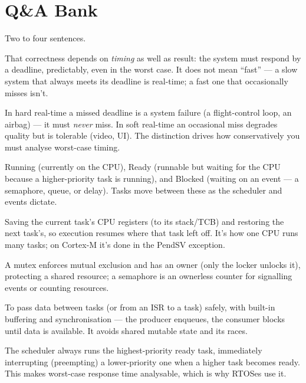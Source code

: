 \section{Q\&A Bank}

%
{Two to four sentences.}

That correctness depends on \emph{timing} as well as result: the system must
respond by a deadline, predictably, even in the worst case. It does not mean
``fast'' --- a slow system that always meets its deadline is real-time; a fast
one that occasionally misses isn't.

In hard real-time a missed deadline is a system failure (a flight-control loop,
an airbag) --- it must \emph{never} miss. In soft real-time an occasional miss
degrades quality but is tolerable (video, UI). The distinction drives how
conservatively you must analyse worst-case timing.

Running (currently on the CPU), Ready (runnable but waiting for the CPU because
a higher-priority task is running), and Blocked (waiting on an event --- a
semaphore, queue, or delay). Tasks move between these as the scheduler and
events dictate.

Saving the current task's CPU registers (to its stack/TCB) and restoring the
next task's, so execution resumes where that task left off. It's how one CPU
runs many tasks; on Cortex-M it's done in the PendSV exception.

A mutex enforces mutual exclusion and has an owner (only the locker unlocks it),
protecting a shared resource; a semaphore is an ownerless counter for signalling
events or counting resources.

To pass data between tasks (or from an ISR to a task) safely, with built-in
buffering and synchronisation --- the producer enqueues, the consumer blocks
until data is available. It avoids shared mutable state and its races.

The scheduler always runs the highest-priority ready task, immediately
interrupting (preempting) a lower-priority one when a higher task becomes ready.
This makes worst-case response time analysable, which is why RTOSes use it.


